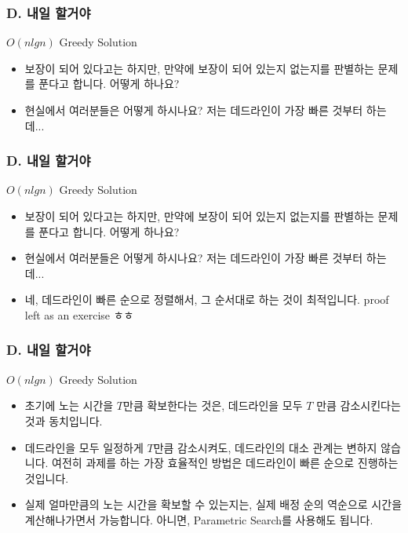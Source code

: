 \documentclass{beamer}
\begin{document}
\begin{frame}
	\frametitle{D. 내일 할거야}
	\begin{block}{$O(nlgn)$ Greedy Solution}
		\begin{itemize}
			\item 보장이 되어 있다고는 하지만, 만약에 보장이 되어 있는지 없는지를 판별하는 문제를 푼다고 합니다. 어떻게 하나요?
			\item 현실에서 여러분들은 어떻게 하시나요? 저는 데드라인이 가장 빠른 것부터 하는데... 
		\end{itemize}
	\end{block}
\end{frame}
\begin{frame}
	\frametitle{D. 내일 할거야}
	\begin{block}{$O(nlgn)$ Greedy Solution}
		\begin{itemize}
			\item 보장이 되어 있다고는 하지만, 만약에 보장이 되어 있는지 없는지를 판별하는 문제를 푼다고 합니다. 어떻게 하나요?
			\item 현실에서 여러분들은 어떻게 하시나요? 저는 데드라인이 가장 빠른 것부터 하는데... 
			\item 네, 데드라인이 빠른 순으로 정렬해서, 그 순서대로 하는 것이 최적입니다. proof left as an exercise ㅎㅎ
		\end{itemize}
	\end{block}
\end{frame}

\begin{frame}
	\frametitle{D. 내일 할거야}
	\begin{block}{$O(nlgn)$ Greedy Solution}
		\begin{itemize}
			\item 초기에 노는 시간을 $T$만큼 확보한다는 것은, 데드라인을 모두 $T$ 만큼 감소시킨다는 것과 동치입니다. 
			\item 데드라인을 모두 일정하게 $T$만큼 감소시켜도, 데드라인의 대소 관계는 변하지 않습니다. 여전히 과제를 하는 가장 효율적인 방법은 데드라인이 빠른 순으로 진행하는 것입니다.
			\item 실제 얼마만큼의 노는 시간을 확보할 수 있는지는, 실제 배정 순의 역순으로 시간을 계산해나가면서 가능합니다. 아니면, Parametric Search를 사용해도 됩니다. 
		\end{itemize}
	\end{block}
\end{frame}
\end{document}

